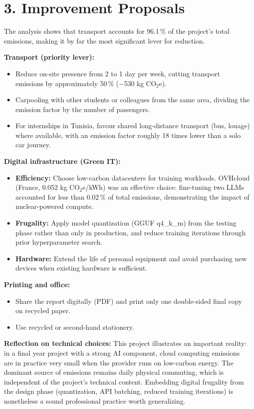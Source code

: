 \section*{3. Improvement Proposals}

The analysis shows that transport accounts for 96.1\,\% of the project's total emissions, making it by far the most significant lever for reduction.

\textbf{Transport (priority lever):}
\begin{itemize}
    \item Reduce on-site presence from 2 to 1 day per week, cutting transport emissions by approximately 50\,\% ($-$530 kg CO$_2$e).
    \item Carpooling with other students or colleagues from the same area, dividing the emission factor by the number of passengers.
    \item For internships in Tunisia, favour shared long-distance transport (bus, louage) where available, with an emission factor roughly 18 times lower than a solo car journey.
\end{itemize}

\textbf{Digital infrastructure (Green IT):}
\begin{itemize}
    \item \textbf{Efficiency:} Choose low-carbon datacenters for training workloads. OVHcloud (France, 0.052 kg CO$_2$e/kWh) was an effective choice: fine-tuning two LLMs accounted for less than 0.02\,\% of total emissions, demonstrating the impact of nuclear-powered compute.
    \item \textbf{Frugality:} Apply model quantization (GGUF q4\_k\_m) from the testing phase rather than only in production, and reduce training iterations through prior hyperparameter search.
    \item \textbf{Hardware:} Extend the life of personal equipment and avoid purchasing new devices when existing hardware is sufficient.
\end{itemize}

\textbf{Printing and office:}
\begin{itemize}
    \item Share the report digitally (PDF) and print only one double-sided final copy on recycled paper.
    \item Use recycled or second-hand stationery.
\end{itemize}

\textbf{Reflection on technical choices:}
This project illustrates an important reality: in a final year project with a strong AI component, cloud computing emissions are in practice very small when the provider runs on low-carbon energy. The dominant source of emissions remains daily physical commuting, which is independent of the project's technical content. Embedding digital frugality from the design phase (quantization, API batching, reduced training iterations) is nonetheless a sound professional practice worth generalizing.
